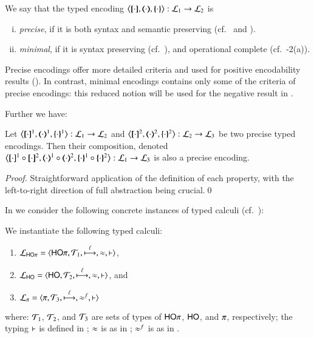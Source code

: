 \begin{definition}\rm
	\label{def:goodenc}
	We say that  the typed encoding 
	$\enco{\map{\cdot}, \mapt{\cdot}, \mapa{\cdot}}: \tyl{L}_1 \to \tyl{L}_2$ is 
%
	\begin{enumerate}[(i)]
		\item	\emph{precise}, if it is both syntax and semantic preserving
			(cf.~ and ).

		\item	\emph{minimal}, if it is syntax preserving 
			(cf.~),
			and operational complete (cf.~-2(a)).
	\end{enumerate}
\end{definition}

Precise encodings offer more detailed criteria and used for positive 
encodability results ().
In contrast, minimal encodings contains only 
some of the criteria of precise encodings:    
this reduced notion will be used 
for the negative result in . 

Further we have:
\begin{proposition}\rm
	\label{prop:enc_composability}
	Let %
	$\enco{\map{\cdot}^{1}, \mapt{\cdot}^{1}, \mapa{\cdot}^{1}}: \tyl{L}_1 \to \tyl{L}_2$
	and 
	$\enco{\map{\cdot}^{2}, \mapt{\cdot}^{2}, \mapa{\cdot}^{2}}: \tyl{L}_2 \to \tyl{L}_3$
	be two precise typed encodings.
	Then their composition, denoted 
	$\enco{\map{\cdot}^{1} \circ \map{\cdot}^{2}, \mapt{\cdot}^{1} \circ \mapt{\cdot}^{2}, \mapa{\cdot}^{1}\circ \mapa{\cdot}^{2}}: \tyl{L}_1 \to \tyl{L}_3$
	is also a precise encoding.
\end{proposition}

\begin{proof}
	Straightforward application of the definition of each property, with the left-to-right direction of
	full abstraction being crucial.\qed
\end{proof}

In  %
we consider the following concrete instances of typed calculi
(cf.~):


\begin{definition}\rm
	We instantiate the following typed calculi:
%
	\begin{enumerate}[1.]
		\item	$\mathcal{L}_{\mathsf{HO}\pi}=\langle \mathsf{HO}\pi, {\cal{T}}_1, \stackrel{\ell}{\longmapsto}, \approx, \vdash \rangle$,
		\item	$\mathcal{L}_{\mathsf{HO}}=\langle \mathsf{HO}, {\cal{T}}_2, \stackrel{\ell}{\longmapsto}, \approx, \vdash \rangle$, and
		\item	$\mathcal{L}_{\pi}=\langle \pi, {\cal{T}}_3, \stackrel{\ell}{\longmapsto}, \approx^{f}, \vdash \rangle$ 
	\end{enumerate}
%
	where: 
	${\cal{T}}_1$, ${\cal{T}}_2$, 
	and ${\cal{T}}_3$
	are sets of types of $\mathsf{HO}\pi$, $\mathsf{HO}$, and $\pi$, respectively;
	the typing $\vdash$ is defined in 
	;  
	$\approx$ is as in ; 
	$\approx^{f}$ is as in .
\end{definition}



